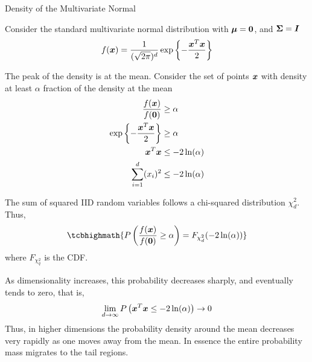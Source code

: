 \ifdefined\wox \begin{frame} \titlepage \end{frame} \fi

\begin{frame}{Density of the Multivariate Normal}

  \small

Consider the standard multivariate normal distribution
with ${\bm \mu} = \mathbf{0}$, and ${\bm \Sigma} = {\boldsymbol I}$ 
\begin{align*}
f({\boldsymbol x}) = \frac{1}{(\sqrt{2\pi})^d}\exp\left\{-\frac{{\boldsymbol x}^T
{\boldsymbol x}}{2}\right\}
\end{align*}

\medskip
The peak of the density is at the mean. 
Consider the set of points ${\boldsymbol x}$ with density at least
$\alpha$ fraction of the density at the mean
\begin{align*}
\frac{f({\boldsymbol x})}{f(\mathbf{0})} & \ge \alpha\nonumber\\
\exp\left\{-\frac{{\boldsymbol x}^T{\boldsymbol x}}{2}\right\}  & \ge \alpha\nonumber\\
 {\boldsymbol x}^T{\boldsymbol x}  & \le -2 \ln (\alpha)\nonumber\\
  \sum_{i=1}^d (x_i)^2 & \le -2 \ln (\alpha)
\end{align*}

\medskip
The sum of squared IID random variables follows a chi-squared
distribution $\chi^2_d$. Thus,
\begin{align*}
\tcbhighmath{
P\lB(\frac{f(\bx)}{f(\bzero)} \geq \alpha\rB) 
=  F_{\chi^2_d}(-2\ln(\alpha))
}
\end{align*}
where $F_{\chi^2_q}$ is the CDF.

\medskip
As dimensionality increases, this probability
decreases sharply, and eventually tends to zero, that is,
\begin{equation*}
\lim_{d\to\infty}  P\left( {\boldsymbol x}^T{\boldsymbol x} \le -2\ln(\alpha) \right) \to 0
\end{equation*}
Thus, in higher dimensions the probability density around the
mean decreases very rapidly as one moves away from the mean. In
essence the entire probability mass migrates to the tail regions.
\end{frame}



\def\pshlabel#1{\scriptsize {$#1$}}
\def\psvlabel#1{\scriptsize {$#1$}}



